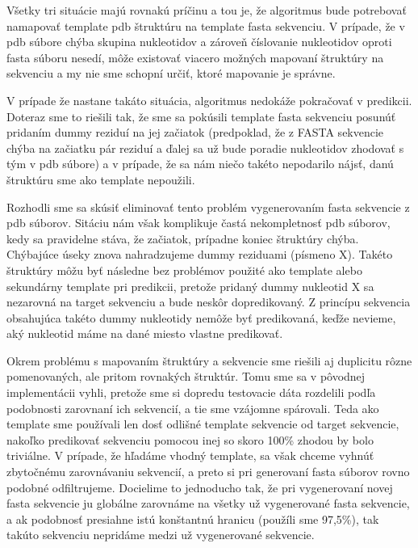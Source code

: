 \indent Všetky tri situácie majú rovnakú príčinu a tou je, že algoritmus bude potrebovať namapovať template pdb štruktúru na template fasta sekvenciu. V prípade, že v pdb súbore chýba skupina nukleotidov a zároveň číslovanie nukleotidov oproti fasta súboru nesedí, môže existovať viacero možných mapovaní štruktúry na sekvenciu a my nie sme schopní určiť, ktoré mapovanie je správne.


\indent V prípade že nastane takáto situácia, algoritmus nedokáže pokračovať v predikcii. Doteraz sme to riešili tak, že sme sa pokúsili template fasta sekvenciu posunúť pridaním dummy reziduí na jej začiatok (predpoklad, že z FASTA sekvencie chýba na začiatku pár reziduí a ďalej sa už bude poradie nukleotidov zhodovať s tým v pdb súbore) a v prípade, že sa nám niečo takéto nepodarilo nájsť, danú štruktúru sme ako template nepoužili.


\indent Rozhodli sme sa skúsiť eliminovať tento problém vygenerovaním fasta sekvencie z pdb súborov. Sitáciu nám však komplikuje častá nekompletnosť pdb súborov, kedy sa pravidelne stáva, že začiatok, prípadne koniec štruktúry chýba. Chýbajúce úseky znova nahradzujeme dummy reziduami (písmeno X). Takéto štruktúry môžu byť následne bez problémov použité ako template alebo sekundárny template pri predikcii, pretože pridaný dummy nukleotid X sa nezarovná na target sekvenciu a bude neskôr dopredikovaný. Z princípu sekvencia obsahujúca takéto dummy nukleotidy nemôže byť predikovaná, keďže nevieme, aký nukleotid máme na dané miesto vlastne predikovať.


\indent Okrem problému s mapovaním štruktúry a sekvencie sme riešili aj duplicitu rôzne pomenovaných, ale pritom rovnakých štruktúr. Tomu sme sa v pôvodnej implementácii vyhli, pretože sme si dopredu testovacie dáta rozdelili podľa podobnosti zarovnaní ich sekvencií, a tie sme vzájomne spárovali. Teda ako template sme používali len dosť odlišné template sekvencie od target sekvencie, nakoľko predikovať sekvenciu pomocou inej so skoro 100\% zhodou by bolo triviálne. V prípade, že hľadáme vhodný template, sa však chceme vyhnúť zbytočnému zarovnávaniu sekvencií, a preto si pri generovaní fasta súborov rovno podobné odfiltrujeme. Docielime to jednoducho tak, že pri vygenerovaní novej fasta sekvencie ju globálne zarovnáme na všetky už vygenerované fasta sekvencie, a ak podobnosť presiahne istú konštantnú hranicu (použíli sme 97,5\%), tak takúto sekvenciu nepridáme medzi už vygenerované sekvencie.